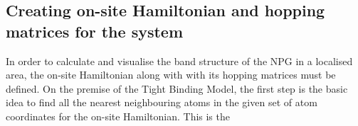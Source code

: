 \subsection{Creating on-site Hamiltonian and hopping matrices for the system}
In order to calculate and visualise the band structure of the NPG in a localised area, the on-site Hamiltonian along with with its hopping matrices must be defined. On the premise of the Tight Binding Model, the first step is the basic idea to find all the nearest neighbouring atoms in the given set of atom coordinates for the on-site Hamiltonian. This is the  

